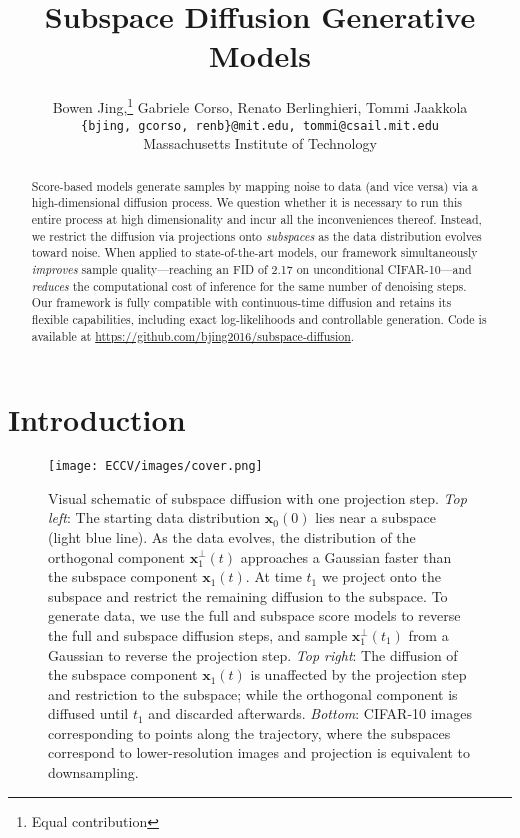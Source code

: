 \documentclass{article}
\begin{document}
\newcommand*\samethanks[1][\value{footnote}]{\footnotemark[#1]}
\title{Subspace Diffusion Generative Models}
\author{Bowen Jing,\thanks{Equal contribution} \; Gabriele Corso,\samethanks \; Renato Berlinghieri, Tommi Jaakkola \\
       {\texttt{\{bjing, gcorso, renb\}@mit.edu, tommi@csail.mit.edu}}\\
       Massachusetts Institute of Technology \\
}

\maketitle
\thispagestyle{empty}

\begin{abstract}
Score-based models generate  samples by mapping noise to data (and vice versa) via a high-dimensional diffusion process. We question whether it is necessary to run this entire process at high dimensionality and incur all the inconveniences thereof. Instead, we restrict the diffusion via projections onto \emph{subspaces} as the data distribution evolves toward noise. When applied to state-of-the-art models, our framework simultaneously \emph{improves} sample quality---reaching an FID of 2.17 on unconditional CIFAR-10---and \emph{reduces} the computational cost of inference for the same number of denoising steps. Our framework is fully compatible with continuous-time diffusion and retains its flexible capabilities, including exact log-likelihoods and controllable generation. Code is available at \url{https://github.com/bjing2016/subspace-diffusion}.
\end{abstract}


\section{Introduction} \label{sec:intro}

\begin{figure}[t]
    \centering
    \texttt{[image: ECCV/images/cover.png]}
    \caption{Visual schematic of subspace diffusion with one projection step. \emph{Top left}: The starting data distribution $\mathbf{x}_0(0)$ lies near a subspace (light blue line). As the data evolves, the distribution of the orthogonal component $\mathbf{x}_1^\perp(t)$ approaches a Gaussian faster than the subspace component $\mathbf{x}_1(t)$. At time $t_1$ we project onto the subspace and restrict the remaining diffusion to the subspace. To generate data, we use the full and subspace score models to reverse the full and subspace diffusion steps, and sample $\mathbf{x}_1^\perp(t_1)$ from a Gaussian to reverse the projection step. \emph{Top right}: The diffusion of the subspace component $\mathbf{x}_1(t)$ is unaffected by the projection step and restriction to the subspace; while the orthogonal component is diffused until $t_1$ and discarded afterwards. \emph{Bottom}: CIFAR-10 images corresponding to points along the trajectory, where the subspaces correspond to lower-resolution images and projection is equivalent to downsampling.}
    \label{fig:method}
\end{figure}
\end{document}
